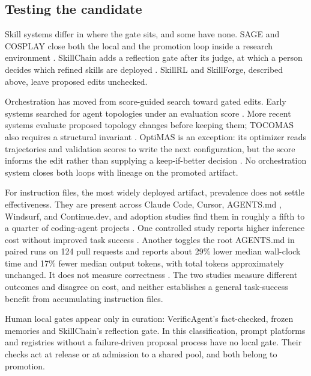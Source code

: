 \subsection{Testing the candidate}\label{testing-the-candidate}

Skill systems differ in where the gate sits, and some have none. SAGE and COSPLAY close both the local and the promotion loop inside a research environment \cite{wang2025sage, wu2026cosplay}. SkillChain adds a reflection gate after its judge, at which a person decides which refined skills are deployed \cite{hu2026skillchain}. SkillRL and SkillForge, described above, leave proposed edits unchecked.

Orchestration has moved from score-guided search toward gated edits. Early systems searched for agent topologies under an evaluation score \cite{zhuge2024gptswarm, zhang2024aflow}. More recent systems evaluate proposed topology changes before keeping them; TOCOMAS also requires a structural invariant \cite{chu2026agentgrad, chen2026harnessforge, zhao2026tocomas}. OptiMAS is an exception: its optimizer reads trajectories and validation scores to write the next configuration, but the score informs the edit rather than supplying a keep-if-better decision \cite{cheng2026optimas}. No orchestration system closes both loops with lineage on the promoted artifact.

For instruction files, the most widely deployed artifact, prevalence does not settle effectiveness. They are present across Claude Code, Cursor, AGENTS.md \cite{agentsmd2025}, Windsurf, and Continue.dev, and adoption studies find them in roughly a fifth to a quarter of coding-agent projects \cite{robbes2026agenticmuch, galster2026harnessconfig}. One controlled study reports higher inference cost without improved task success \cite{gloaguen2026agentsmd}. Another toggles the root AGENTS.md in paired runs on 124 pull requests and reports about 29\% lower median wall-clock time and 17\% fewer median output tokens, with total tokens approximately unchanged. It does not measure correctness \cite{lulla2026empirical}. The two studies measure different outcomes and disagree on cost, and neither establishes a general task-success benefit from accumulating instruction files.

Human local gates appear only in curation: VerificAgent's fact-checked, frozen memories \cite{nguyen2025verificagent} and SkillChain's reflection gate. In this classification, prompt platforms and registries without a failure-driven proposal process have no local gate. Their checks act at release or at admission to a shared pool, and both belong to promotion.

